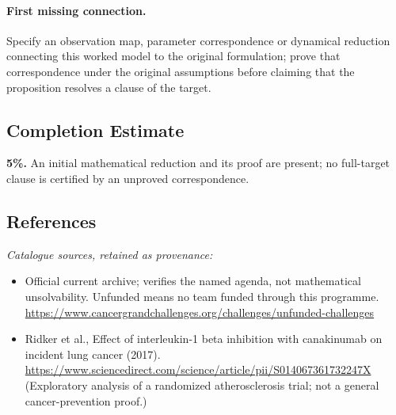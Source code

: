 \documentclass[11pt]{article}
\begin{document}
\paragraph{First missing connection.} Specify an observation map, parameter correspondence or dynamical reduction connecting this worked model to the original formulation; prove that correspondence under the original assumptions before claiming that the proposition resolves a clause of the target.
\subsection{Completion Estimate}
\textbf{5\%.} An initial mathematical reduction and its proof are present; no full-target clause is certified by an unproved correspondence.
\subsection{References}
\noindent\emph{Catalogue sources, retained as provenance:}
\begin{itemize}
\item Official current archive; verifies the named agenda, not mathematical unsolvability. Unfunded means no team funded through this programme. \url{https://www.cancergrandchallenges.org/challenges/unfunded-challenges}
\item Ridker et al., Effect of interleukin-1 beta inhibition with canakinumab on incident lung cancer (2017). \url{https://www.sciencedirect.com/science/article/pii/S014067361732247X} (Exploratory analysis of a randomized atherosclerosis trial; not a general cancer-prevention proof.)
\end{itemize}
\clearpage


\appendix
\end{document}
